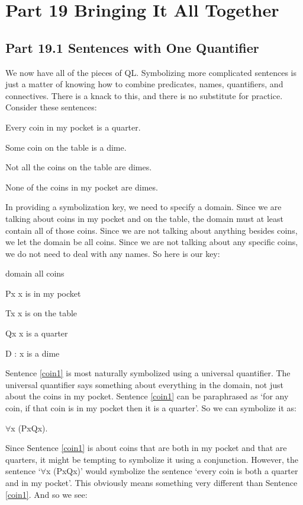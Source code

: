 \chapter{Part 19 Bringing It All Together}
\section{Part 19.1 Sentences with One Quantifier}
We now have all of the pieces of QL. Symbolizing more complicated sentences is just a matter of knowing how to combine predicates, names, quantifiers, and connectives. There is a knack to this, and there is no substitute for practice. Consider these sentences:
\begin{earg}
\item[\ex{coin1}] Every coin in my pocket is a quarter.
\item[\ex{coin2}] Some coin on the table is a dime.
\item[\ex{coin3}] Not all the coins on the table are dimes.
\item[\ex{coin4}] None of the coins in my pocket are dimes.
\end{earg}
In providing a symbolization key, we need to specify a domain. Since we are talking about coins in my pocket and on the table, the domain must at least contain all of those coins. Since we are not talking about anything besides coins, we let the domain be all coins. Since we are not talking about any specific coins, we do not need to deal with any names. So here is our key:
\begin{ekey}
\item[domain] all coins
\item[Px]  x is in my pocket
\item[Tx] x is on the table
\item[Qx] x is a quarter
\item[D]: x is a dime
\end{ekey}
Sentence \ref{coin1} is most naturally symbolized using a universal quantifier. The universal quantifier says something about everything in the domain, not just about the coins in my pocket. Sentence \ref{coin1} can be paraphrased as ‘for any coin, if that coin is in my pocket then it is a quarter’. So we can symbolize it as:
\begin{center}
$\forall$x (Px\eif Qx).
\end{center}
Since Sentence \ref{coin1} is about coins that are both in my pocket and that are quarters, it might be tempting to symbolize it using a conjunction. However, the sentence ‘$\forall$x (Px\eand Qx)’ would symbolize the sentence ‘every coin is both a quarter and in my pocket’. This obviously means something very different than Sentence \ref{coin1}. And so we see:
